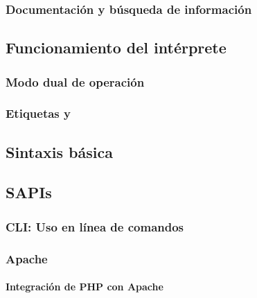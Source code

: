 \documentclass[a4paper,11pt,spanish]{sphinxmanual}
\begin{document}
\subsubsection{Documentación y búsqueda de información}
\label{\detokenize{php:documentacion-y-busqueda-de-informacion}}

\subsection{Funcionamiento del intérprete}
\label{\detokenize{php:funcionamiento-del-interprete}}

\subsubsection{Modo dual de operación}
\label{\detokenize{php:modo-dual-de-operacion}}

\subsubsection{Etiquetas  y }
\label{\detokenize{php:etiquetas-php-y}}

\subsection{Sintaxis básica}
\label{\detokenize{php:sintaxis-basica}}

\subsection{SAPIs}
\label{\detokenize{php:sapis}}

\subsubsection{CLI: Uso en línea de comandos}
\label{\detokenize{php:cli-uso-en-linea-de-comandos}}

\subsubsection{Apache}
\label{\detokenize{php:apache}}

\paragraph{Integración de PHP con Apache}
\label{\detokenize{php:integracion-de-php-con-apache}}
\end{document}
